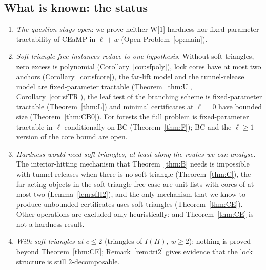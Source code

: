 \subsection{What is known: the status}\label{sec:softstatus}
\begin{enumerate}
\item \emph{The question stays open}: we prove neither W[1]-hardness nor fixed-parameter tractability of CEaMP in $\ell+w$ (Open Problem~\ref{op:main}).
\item \emph{Soft-triangle-free instances reduce to one hypothesis.} Without soft triangles, zero excess is polynomial (Corollary~\ref{cor:sfpoly}), lock cores have at most two anchors (Corollary~\ref{cor:sfcore}), the far-lift model and the tunnel-release model are fixed-parameter tractable (Theorem~\ref{thm:U}, Corollary~\ref{cor:sfTR}), the leaf test of the branching scheme is fixed-parameter tractable (Theorem~\ref{thm:L}) and minimal certificates at $\ell=0$ have bounded size (Theorem~\ref{thm:CB0}). For forests the full problem is fixed-parameter tractable in $\ell$ conditionally on BC (Theorem~\ref{thm:F}); BC and the $\ell\ge1$ version of the core bound are open.
\item \emph{Hardness would need soft triangles, at least along the routes we can analyse.} The interior-hitting mechanism that Theorem~\ref{thm:B} needs is impossible with tunnel releases when there is no soft triangle (Theorem~\ref{thm:C}), the far-acting objects in the soft-triangle-free case are unit lists with cores of at most two (Lemma~\ref{lem:sfH2}), and the only mechanism that we know to produce unbounded certificates uses soft triangles (Theorem~\ref{thm:CE}). Other operations are excluded only heuristically; and Theorem~\ref{thm:CE} is not a hardness result.
\item \emph{With soft triangles at $c\le2$} (triangles of $I(H)$, $w\ge2$): nothing is proved beyond Theorem~\ref{thm:CE}; Remark~\ref{rem:tri2} gives evidence that the lock structure is still $2$-decomposable.
\end{enumerate}
